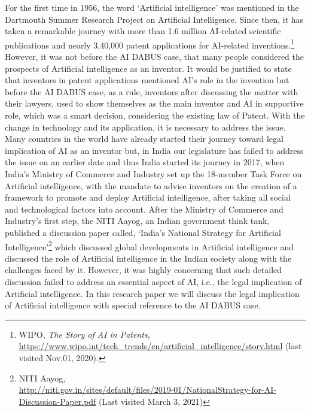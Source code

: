 \setcounter{figure}{0}
\setcounter{table}{0}
\setcounter{footnote}{0}




\begin{multicols}{2}


\noi
For the first time in 1956, the word ‘Artificial intelligence’ was mentioned in the Dartmouth
Summer Research Project on Artificial Intelligence. Since then, it has taken a remarkable
journey with more than 1.6 million AI-related scientific publications and nearly 3,40,000
patent applications for AI-related inventions.\footnote{WIPO, \textit{The Story of AI in Patents}, \url{https://www.wipo.int/tech_trends/en/artificial_intelligence/story.html} (last
visited Nov.01, 2020).}
However, it was not before the AI DABUS
case, that many people considered the prospects of Artificial intelligence as an inventor. It
would be justified to state that inventors in patent applications mentioned AI’s role in the
invention but before the AI DABUS case, as a rule, inventors after discussing the matter
with their lawyers, used to show themselves as the main inventor and AI in supportive role,
which was a smart decision, considering the existing law of Patent. With the change in
technology and its application, it is necessary to address the issue. Many countries in the
world have already started their journey toward legal implication of AI as an inventor but, in
India our legislature has failed to address the issue on an earlier date and thus India started
its journey in 2017, when India’s Ministry of Commerce and Industry set up the 18-member
Task Force on Artificial intelligence, with the mandate to advise inventors on the creation of
a framework to promote and deploy Artificial intelligence, after taking all social and
technological factors into account. After the Ministry of Commerce and Industry’s first step,
the NITI Aayog, an Indian government think tank, published a discussion paper called,
‘India’s National Strategy for Artificial Intelligence’\footnote{NITI Aayog,\\ \url{http://niti.gov.in/sites/default/files/2019-01/NationalStrategy-for-AI-Discussion-Paper.pdf} (Last
visited March 3, 2021)}
which discussed global developments
in Artificial intelligence and discussed the role of Artificial intelligence in the Indian society
along with the challenges faced by it. However, it was highly concerning that such detailed
discussion failed to address an essential aspect of AI, i.e., the legal implication of Artificial intelligence. In this research paper we will discuss the legal implication of Artificial
intelligence with special reference to the AI DABUS case.


\end{multicols}
